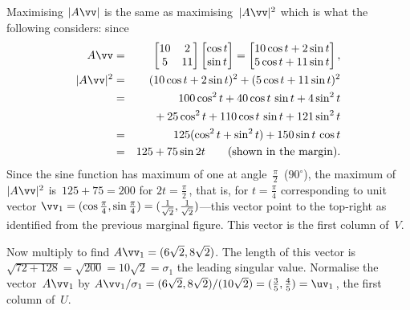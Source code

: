 \begin{example}
\begin{solution}
Maximising \(|A\vv|\) is the same as maximising~\(|A\vv|^2\) which is what the following considers: since
\begin{eqnarray*}
A\vv&=&\begin{bmatrix} 10&2\\5&11 \end{bmatrix}
\begin{bmatrix} \cos t\\\sin t \end{bmatrix}
=\begin{bmatrix} 10\cos t+2\sin t\\5\cos t+11\sin t \end{bmatrix},
\\|A\vv|^2&=&(10\cos t+2\sin t)^2+(5\cos t+11\sin t)^2
\\&=&100\cos^2 t+40\cos t\,\sin t+4\sin^2 t
\\&&{}+25\cos^2 t+110\cos t\,\sin t+121\sin^2 t
\\&=&125(\cos^2t+\sin^2t)+150\sin t\,\cos t
\\&=&125+75\sin 2t \qquad(\text{shown in the margin}).
\end{eqnarray*}
%
Since the sine function has maximum of one at angle~\(\frac\pi2\)~(\(90^\circ\)), the maximum of~\(|A\vv|^2\) is~\(125+75=200\) for \(2t=\frac\pi2\)\,, that is, for \(t=\frac\pi4\) corresponding to unit vector \(\vv_1=(\cos\frac\pi4,\sin\frac\pi4)=(\frac1{\sqrt2},\frac1{\sqrt2})\)---this vector point to the top-right as identified from the previous marginal figure.
This vector is the first column of~\(V\).

Now multiply to find \(A\vv_1=(6\sqrt2,8\sqrt2)\).  
The length of this vector is \(\sqrt{72+128}=\sqrt{200}=10\sqrt 2=\sigma_1\) the leading singular value.  
Normalise the vector~\(A\vv_1\) by \(A\vv_1/\sigma_1 =(6\sqrt2,8\sqrt2)/(10\sqrt2) =(\frac35,\frac45) =\uv_1\)\,, the first column of~\(U\).


\end{solution}
\end{example}
